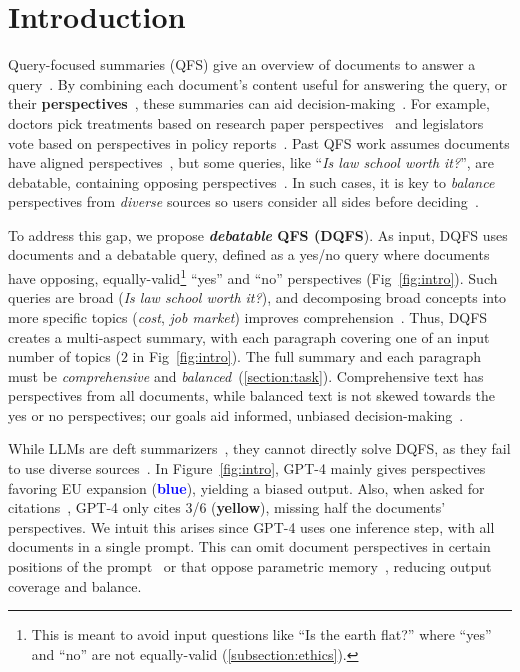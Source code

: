 \section{Introduction}

Query-focused summaries (QFS) give an overview of documents to answer a query~\cite{rosner2008multisum, el2021automatic}.
By combining each document's content useful for answering the query, or their \textbf{perspectives}~\cite{lin2006side}, these summaries can aid decision-making~\cite{hsu2021decision}.
For example, doctors pick treatments based on research paper perspectives~\cite{goff2008patients} and legislators vote based on perspectives in policy reports~\cite{jones1994reconceiving}. 
Past QFS work assumes documents have aligned perspectives~\cite{roy2023review}, but some queries, like ``\emph{Is law school worth it?}'', are debatable, containing opposing perspectives~\cite{wan2024evidence}.
In such cases, it is key to \textit{balance} perspectives from \textit{diverse} sources so users consider all sides before deciding~\cite{dale2015heuristics}.

To address this gap, we propose \textbf{\textit{debatable} QFS (DQFS}).
As input, DQFS uses documents and a debatable query, defined as a yes/no query where documents have opposing, equally-valid\footnote{This is meant to avoid input questions like ``Is the earth flat?'' where ``yes'' and ``no'' are not equally-valid (\cref{subsection:ethics}).} ``yes'' and ``no'' perspectives (Fig~\ref{fig:intro}).
Such queries are broad (\textit{Is law school worth it?}), and decomposing broad concepts into more specific topics (\textit{cost}, \textit{job market}) improves comprehension~\cite{johnson1983mental}.
Thus, DQFS creates a multi-aspect summary, with each paragraph covering one of an input number of topics ($2$ in Fig~\ref{fig:intro}).
The full summary and each paragraph must be \textit{comprehensive} and \textit{balanced}~(\cref{section:task}).
Comprehensive text has perspectives from all documents, while balanced text is not skewed towards the yes or no perspectives; our goals aid informed, unbiased decision-making~\cite{ziems2024measuring}.


While LLMs are deft summarizers~\cite{zhang2024benchmarking}, they cannot directly solve DQFS, as they fail to use diverse sources~\cite{huang-etal-2024-embrace}.
In Figure~\ref{fig:intro}, GPT-4 mainly gives perspectives favoring EU expansion (\textcolor{blue}{\textbf{blue}}), yielding a biased output.
Also, when asked for citations~\cite{huang-chang-2024-citation}, GPT-4 only cites 3/6 (\textcolor{yellowcite}{\textbf{yellow}}), missing half the documents' perspectives.
We intuit this arises since GPT-4 uses one inference step, with all documents in a single prompt.
This can omit document perspectives in certain positions of the prompt~\cite{liu2024lost} or that oppose parametric memory~\cite{jin2024tug}, reducing output coverage and balance.

